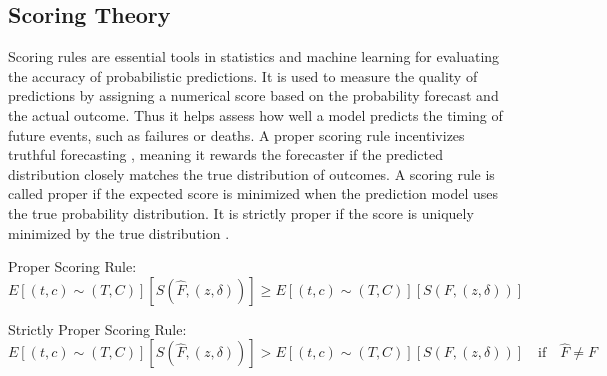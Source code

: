 \subsection{Scoring Theory}
\par \noindent Scoring rules are essential tools in statistics and machine learning for evaluating the accuracy of probabilistic predictions. \parencite{yanagisawa_proper_2023} It is used to measure the quality of predictions by assigning a numerical score based on the probability forecast and the actual outcome. Thus it helps assess how well a model predicts the timing of future events, such as failures or deaths. A proper scoring rule incentivizes truthful forecasting \parencite{yanagisawa_proper_2023}, meaning it rewards the forecaster if the predicted distribution closely matches the true distribution of outcomes. A scoring rule is called proper \parencite{yanagisawa_proper_2023} if the expected score is minimized when the prediction model uses the true probability distribution. It is strictly proper if the score is uniquely minimized by the true distribution \parencite{yanagisawa_proper_2023}.

\noindent Proper Scoring Rule:
\begin{equation} \label{eq:proper}
E[(t,c) \sim (T,C)][S(\hat{F}, (z, \delta))] \geq E[(t,c) \sim (T,C)][S(F, (z, \delta))]
\end{equation}

\noindent Strictly Proper Scoring Rule:
\begin{equation} \label{eq:strictproper}
E[(t,c) \sim (T,C)][S(\hat{F}, (z, \delta))] > E[(t,c) \sim (T,C)][S(F, (z, \delta))] \quad \text{if} \quad \hat{F} \neq F
\end{equation}
